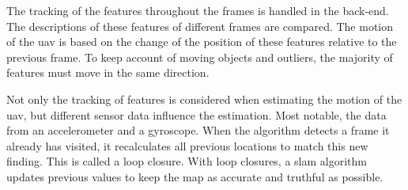 The tracking of the features throughout the frames is handled in the back\hyp{}end. The descriptions of these features of different frames are compared. The motion of the \acs{uav} is based on the change of the position of these features relative to the previous frame. To keep account of moving objects and outliers, the majority of features must move in the same direction.

Not only the tracking of features is considered when estimating the motion of the \acs{uav}, but different sensor data influence the estimation. Most notable, the data from an accelerometer and a gyroscope. When the algorithm detects a frame it already has visited, it recalculates all previous locations to match this new finding. This is called a loop closure. With loop closures, a \acs{slam} algorithm updates previous values to keep the map as accurate and truthful as possible.